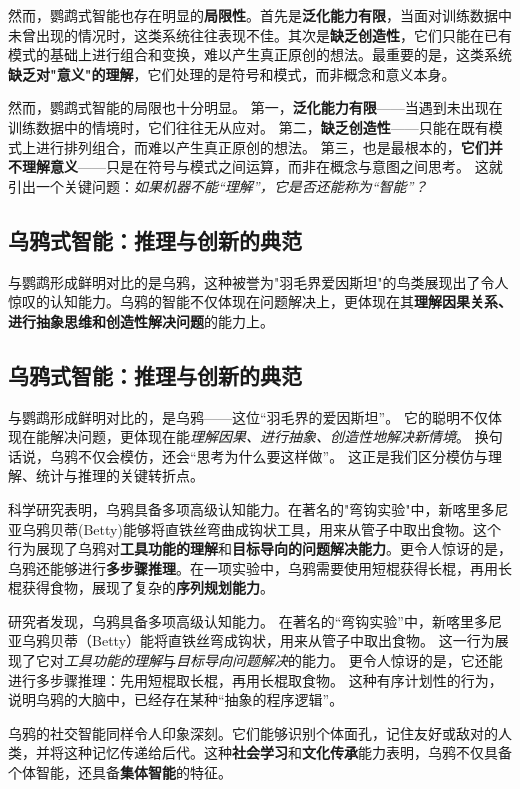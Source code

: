 然而，鹦鹉式智能也存在明显的\textbf{局限性}。首先是\textbf{泛化能力有限}，当面对训练数据中未曾出现的情况时，这类系统往往表现不佳。其次是\textbf{缺乏创造性}，它们只能在已有模式的基础上进行组合和变换，难以产生真正原创的想法。最重要的是，这类系统\textbf{缺乏对"意义"的理解}，它们处理的是符号和模式，而非概念和意义本身。

然而，鹦鹉式智能的局限也十分明显。
第一，\textbf{泛化能力有限}——当遇到未出现在训练数据中的情境时，它们往往无从应对。
第二，\textbf{缺乏创造性}——只能在既有模式上进行排列组合，而难以产生真正原创的想法。
第三，也是最根本的，\textbf{它们并不理解意义}——只是在符号与模式之间运算，而非在概念与意图之间思考。
这就引出一个关键问题：\emph{如果机器不能“理解”，它是否还能称为“智能”？}

\subsection{乌鸦式智能：推理与创新的典范}

与鹦鹉形成鲜明对比的是乌鸦，这种被誉为"羽毛界爱因斯坦"的鸟类展现出了令人惊叹的认知能力。乌鸦的智能不仅体现在问题解决上，更体现在其\textbf{理解因果关系、进行抽象思维和创造性解决问题}的能力上。

\subsection{乌鸦式智能：推理与创新的典范}

与鹦鹉形成鲜明对比的，是乌鸦——这位“羽毛界的爱因斯坦”。
它的聪明不仅体现在能解决问题，更体现在能\emph{理解因果、进行抽象、创造性地解决新情境}。
换句话说，乌鸦不仅会模仿，还会“思考为什么要这样做”。
这正是我们区分模仿与理解、统计与推理的关键转折点。

科学研究表明，乌鸦具备多项高级认知能力。在著名的"弯钩实验"中，新喀里多尼亚乌鸦贝蒂(Betty)能够将直铁丝弯曲成钩状工具，用来从管子中取出食物。这个行为展现了乌鸦对\textbf{工具功能的理解}和\textbf{目标导向的问题解决能力}。更令人惊讶的是，乌鸦还能够进行\textbf{多步骤推理}。在一项实验中，乌鸦需要使用短棍获得长棍，再用长棍获得食物，展现了复杂的\textbf{序列规划能力}。

研究者发现，乌鸦具备多项高级认知能力。
在著名的“弯钩实验”中，新喀里多尼亚乌鸦贝蒂（Betty）能将直铁丝弯成钩状，用来从管子中取出食物。
这一行为展现了它对\emph{工具功能的理解}与\emph{目标导向问题解决}的能力。
更令人惊讶的是，它还能进行多步骤推理：先用短棍取长棍，再用长棍取食物。
这种有序计划性的行为，说明乌鸦的大脑中，已经存在某种“抽象的程序逻辑”。

乌鸦的社交智能同样令人印象深刻。它们能够识别个体面孔，记住友好或敌对的人类，并将这种记忆传递给后代。这种\textbf{社会学习}和\textbf{文化传承}能力表明，乌鸦不仅具备个体智能，还具备\textbf{集体智能}的特征。

